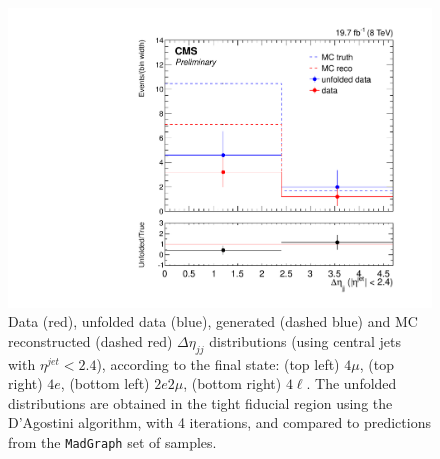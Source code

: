 \begin{figure}[hbtp]
\begin{center}
    \includegraphics[width=\cmsFigWidth]{Figures/CentralDeta_ZZTo4l_Mad_fr}       
    \caption{\footnotesize{Data (red), unfolded data (blue), generated (dashed blue) and MC reconstructed (dashed red) $\Delta\eta_{jj}$ distributions (using central jets with $\eta^{jet}<2.4$), according to the final state: (top left) $4\mu$, (top right) $4e$, (bottom left) $2e2\mu$, (bottom right) $4\ell$. The unfolded distributions are obtained in the tight fiducial region using the D'Agostini algorithm, with 4 iterations, and compared to predictions from the \texttt{MadGraph} set of samples.}} 
    \label{fig:CentralDeta_unfolding}
  \end{center}
\end{figure}

